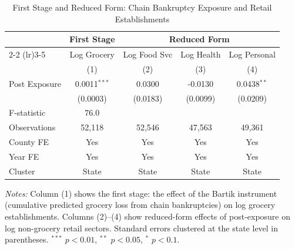 \begin{table}[htbp]
\centering
\caption{First Stage and Reduced Form: Chain Bankruptcy Exposure and Retail Establishments}
\label{tab:firststage}
\small
\begin{tabular}{lcccc}
\hline\hline
 & \multicolumn{1}{c}{First Stage} & \multicolumn{3}{c}{Reduced Form} \\
\cmidrule(lr){2-2} \cmidrule(lr){3-5}
 & Log Grocery & Log Food Svc & Log Health & Log Personal \\
 & (1) & (2) & (3) & (4) \\
\hline
Post Exposure & 0.0011$^{***}$ & 0.0300 & -0.0130 & 0.0438$^{**}$ \\
 & (0.0003) & (0.0183) & (0.0099) & (0.0209) \\
\hline
F-statistic & 76.0 & & & \\
Observations & 52,118 & 52,546 & 47,563 & 49,361 \\
County FE & Yes & Yes & Yes & Yes \\
Year FE & Yes & Yes & Yes & Yes \\
Cluster & State & State & State & State \\
\hline\hline
\end{tabular}
\begin{tablenotes}
\item \textit{Notes:} Column (1) shows the first stage: the effect of the Bartik instrument (cumulative predicted grocery loss from chain bankruptcies) on log grocery establishments. Columns (2)--(4) show reduced-form effects of post-exposure on log non-grocery retail sectors. Standard errors clustered at the state level in parentheses. $^{***}$ $p<0.01$, $^{**}$ $p<0.05$, $^{*}$ $p<0.1$.
\end{tablenotes}
\end{table}
